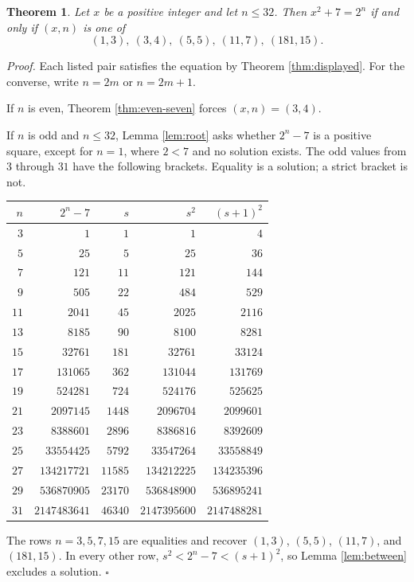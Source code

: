 \documentclass[11pt,letterpaper]{article}
\newtheorem{theorem}{Theorem}
\newenvironment{proof}{\noindent\textit{Proof.}}{\hfill\(\square\)}
\begin{document}
\begin{theorem}
\label{thm:box-seven}
Let \(x\) be a positive integer and let \(n\le 32\). Then \(x^2+7=2^n\) if and only if \((x,n)\) is one of
\[
(1,3),\ (3,4),\ (5,5),\ (11,7),\ (181,15).
\]
\end{theorem}

\begin{proof}
Each listed pair satisfies the equation by Theorem \ref{thm:displayed}. For the converse, write \(n=2m\) or \(n=2m+1\).

If \(n\) is even, Theorem \ref{thm:even-seven} forces \((x,n)=(3,4)\).

If \(n\) is odd and \(n\le 32\), Lemma \ref{lem:root} asks whether \(2^n-7\) is a positive square, except for \(n=1\), where \(2<7\) and no solution exists. The odd values from \(3\) through \(31\) have the following brackets. Equality is a solution; a strict bracket is not.

\begin{center}
\begin{tabular}{rrrrr}
\toprule
\(n\) & \(2^n-7\) & \(s\) & \(s^2\) & \((s+1)^2\) \\
\midrule
\(3\) & \(1\) & \(1\) & \(1\) & \(4\) \\
\(5\) & \(25\) & \(5\) & \(25\) & \(36\) \\
\(7\) & \(121\) & \(11\) & \(121\) & \(144\) \\
\(9\) & \(505\) & \(22\) & \(484\) & \(529\) \\
\(11\) & \(2041\) & \(45\) & \(2025\) & \(2116\) \\
\(13\) & \(8185\) & \(90\) & \(8100\) & \(8281\) \\
\(15\) & \(32761\) & \(181\) & \(32761\) & \(33124\) \\
\(17\) & \(131065\) & \(362\) & \(131044\) & \(131769\) \\
\(19\) & \(524281\) & \(724\) & \(524176\) & \(525625\) \\
\(21\) & \(2097145\) & \(1448\) & \(2096704\) & \(2099601\) \\
\(23\) & \(8388601\) & \(2896\) & \(8386816\) & \(8392609\) \\
\(25\) & \(33554425\) & \(5792\) & \(33547264\) & \(33558849\) \\
\(27\) & \(134217721\) & \(11585\) & \(134212225\) & \(134235396\) \\
\(29\) & \(536870905\) & \(23170\) & \(536848900\) & \(536895241\) \\
\(31\) & \(2147483641\) & \(46340\) & \(2147395600\) & \(2147488281\) \\
\bottomrule
\end{tabular}
\end{center}

The rows \(n=3,5,7,15\) are equalities and recover \((1,3)\), \((5,5)\), \((11,7)\), and \((181,15)\). In every other row, \(s^2<2^n-7<(s+1)^2\), so Lemma \ref{lem:between} excludes a solution.
\end{proof}
\end{document}
